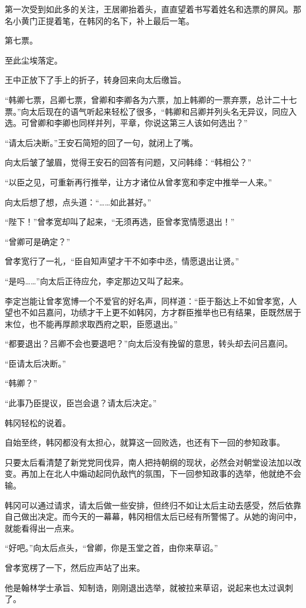 第一次受到如此多的关注，王居卿抬着头，直直望着书写着姓名和选票的屏风。那名小黄门正提着笔，在韩冈的名下，补上最后一笔。

第七票。

至此尘埃落定。

王中正放下了手上的折子，转身回来向太后缴旨。

“韩卿七票，吕卿七票，曾卿和李卿各为六票，加上韩卿的一票弃票，总计二十七票。”向太后现在的语气听起来轻松了很多，“韩卿和吕卿并列头名无异议，同应入选。可曾卿和李卿也同样并列，平章，你说这第三人该如何选出？”

“请太后决断。”王安石简短的回了一句，就闭上了嘴。

向太后皱了皱眉，觉得王安石的回答有问题，又问韩绛：“韩相公？”

“以臣之见，可重新再行推举，让方才诸位从曾孝宽和李定中推举一人来。”

向太后想了想，点头道：“……如此甚好。”

“陛下！”曾孝宽却叫了起来，“无须再选，臣曾孝宽情愿退出！”

“曾卿可是确定？”

曾孝宽行了一礼，“臣自知声望才干不如李中丞，情愿退出让贤。”

“是吗……”向太后正待应允，李定那边又叫了起来。

李定岂能让曾孝宽博一个不爱官的好名声，同样道：“臣于豁达上不如曾孝宽，人望也不如吕嘉问，功绩才干上更不如韩冈，方才群臣推举也已有结果，臣既然居于末位，也不能再厚颜求取西府之职，臣愿退出。”

“都要退出？吕卿不会也要退吧？”向太后没有挽留的意思，转头却去问吕嘉问。

“臣请太后决断。”

“韩卿？”

“此事乃臣提议，臣岂会退？请太后决定。”

韩冈轻松的说着。

自始至终，韩冈都没有太担心，就算这一回败选，也还有下一回的参知政事。

只要太后看清楚了新党党同伐异，南人把持朝纲的现状，必然会对朝堂设法加以改变。再加上在北人中煽动起同仇敌忾的氛围，下一回参知政事的选举，他就绝不会输。

韩冈可以通过请求，请太后做一些安排，但终归不如让太后主动去感受，然后依靠自己做出决定。而今天的一幕幕，韩冈相信太后已经有所警惕了。从她的询问中，就能看得出一点来。

“好吧。”向太后点头，“曾卿，你是玉堂之首，由你来草诏。”

曾孝宽楞了一下，然后应声站了出来。

他是翰林学士承旨、知制诰，刚刚退出选举，就被拉来草诏，说起来也太过讽刺了。

